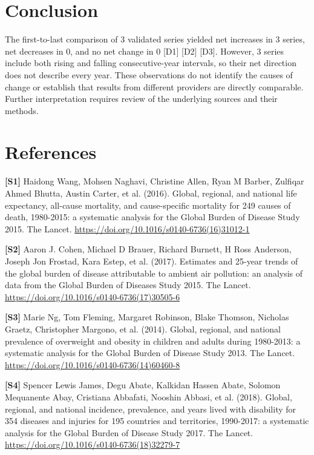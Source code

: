 \documentclass[10pt,a4paper]{article}
\begin{document}
\section{Conclusion}
The first-to-last comparison of 3 validated series yielded net increases in 3 series, net decreases in 0, and no net change in 0 [D1] [D2] [D3]. However, 3 series include both rising and falling consecutive-year intervals, so their net direction does not describe every year. These observations do not identify the causes of change or establish that results from different providers are directly comparable.
Further interpretation requires review of the underlying sources and their methods.
\section*{References}
\noindent\textbf{[S1]} Haidong Wang, Mohsen Naghavi, Christine Allen, Ryan M Barber, Zulfiqar Ahmed Bhutta, Austin Carter, et al. (2016). Global, regional, and national life expectancy, all-cause mortality, and cause-specific mortality for 249 causes of death, 1980-2015: a systematic analysis for the Global Burden of Disease Study 2015. The Lancet. \url{https://doi.org/10.1016/s0140-6736(16)31012-1}\par

\noindent\textbf{[S2]} Aaron J. Cohen, Michael D Brauer, Richard Burnett, H Ross Anderson, Joseph Jon Frostad, Kara Estep, et al. (2017). Estimates and 25-year trends of the global burden of disease attributable to ambient air pollution: an analysis of data from the Global Burden of Diseases Study 2015. The Lancet. \url{https://doi.org/10.1016/s0140-6736(17)30505-6}\par

\noindent\textbf{[S3]} Marie Ng, Tom Fleming, Margaret Robinson, Blake Thomson, Nicholas Graetz, Christopher Margono, et al. (2014). Global, regional, and national prevalence of overweight and obesity in children and adults during 1980-2013: a systematic analysis for the Global Burden of Disease Study 2013. The Lancet. \url{https://doi.org/10.1016/s0140-6736(14)60460-8}\par

\noindent\textbf{[S4]} Spencer Lewis James, Degu Abate, Kalkidan Hassen Abate, Solomon Mequanente Abay, Cristiana Abbafati, Nooshin Abbasi, et al. (2018). Global, regional, and national incidence, prevalence, and years lived with disability for 354 diseases and injuries for 195 countries and territories, 1990-2017: a systematic analysis for the Global Burden of Disease Study 2017. The Lancet. \url{https://doi.org/10.1016/s0140-6736(18)32279-7}\par
\end{document}
